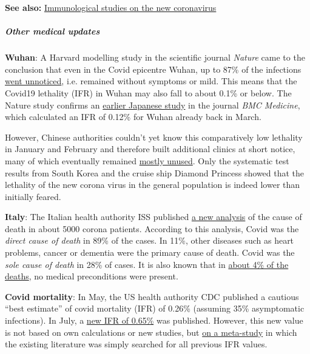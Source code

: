 \textbf{See also:}
\href{https://swprs.org/studies-on-covid-19-lethality/}{Immunological
studies on the new coronavirus}

\hypertarget{other-medical-updates}{%
\subparagraph{\texorpdfstring{\textbf{Other medical
updates}}{Other medical updates}}\label{other-medical-updates}}

\textbf{Wuhan}: A Harvard modelling study in the scientific journal
\emph{Nature} came to the conclusion that even in the Covid epicentre
Wuhan, up to 87\% of the infections
\href{https://news.harvard.edu/gazette/story/2020/07/study-finds-early-wuhan-covid-cases-largely-undetected/}{went
unnoticed}, i.e. remained without symptoms or mild. This means that the
Covid19 lethality (IFR) in Wuhan may also fall to about 0.1\% or below.
The Nature study confirms an
\href{https://www.medrxiv.org/content/10.1101/2020.02.12.20022434v3}{earlier
Japanese study} in the journal \emph{BMC Medicine}, which calculated an
IFR of 0.12\% for Wuhan already back in March.

However, Chinese authorities couldn't yet know this comparatively low
lethality in January and February and therefore built additional clinics
at short notice, many of which eventually remained
\href{https://www.theguardian.com/world/2020/feb/12/what-chinas-empty-new-coronavirus-hospitals-say-about-its-secretive-system}{mostly
unused}. Only the systematic test results from South Korea and the
cruise ship Diamond Princess showed that the lethality of the new corona
virus in the general population is indeed lower than initially feared.

\textbf{Italy}: The Italian health authority ISS published
\href{https://www.reuters.com/article/us-health-coronavirus-italy-study-idUSKCN24H2VZ}{a
new analysis} of the cause of death in about 5000 corona patients.
According to this analysis, Covid was the \emph{direct cause of death}
in 89\% of the cases. In 11\%, other diseases such as heart problems,
cancer or dementia were the primary cause of death. Covid was the
\emph{sole cause of death} in 28\% of cases. It is also known that in
\href{https://www.bloomberg.com/news/articles/2020-05-26/italy-says-96-of-virus-fatalities-suffered-from-other-illnesses}{about
4\% of the deaths}, no medical preconditions were present.

\textbf{Covid mortality}: In May, the US health authority CDC published
a cautious ``best estimate'' of covid mortality (IFR) of 0.26\%
(assuming 35\% asymptomatic infections). In July, a
\href{https://www.cdc.gov/coronavirus/2019-ncov/hcp/planning-scenarios.html}{new
IFR of 0.65\%} was published. However, this new value is not based on
own calculations or new studies, but
\href{https://www.medrxiv.org/content/10.1101/2020.05.03.20089854v4}{on
a meta-study} in which the existing literature was simply searched for
all previous IFR values.

